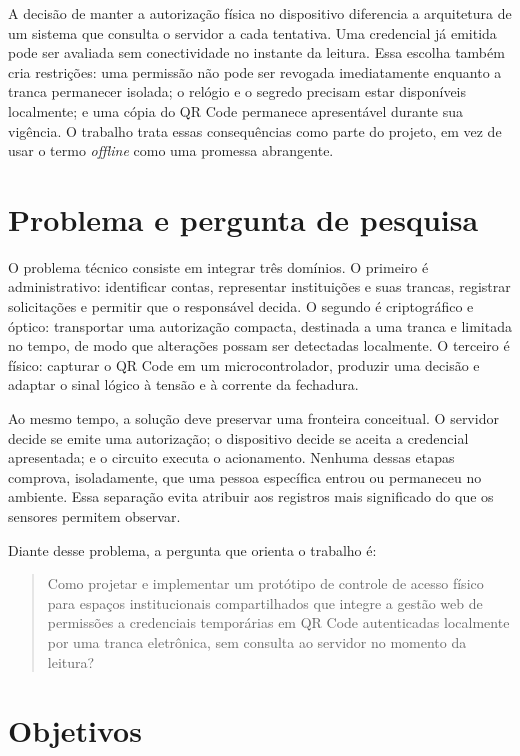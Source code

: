 A decisão de manter a autorização física no dispositivo diferencia a arquitetura de um sistema que consulta o servidor a cada tentativa. Uma credencial já emitida pode ser avaliada sem conectividade no instante da leitura. Essa escolha também cria restrições: uma permissão não pode ser revogada imediatamente enquanto a tranca permanecer isolada; o relógio e o segredo precisam estar disponíveis localmente; e uma cópia do QR Code permanece apresentável durante sua vigência. O trabalho trata essas consequências como parte do projeto, em vez de usar o termo \textit{offline} como uma promessa abrangente.

\section{Problema e pergunta de pesquisa}

O problema técnico consiste em integrar três domínios. O primeiro é administrativo: identificar contas, representar instituições e suas trancas, registrar solicitações e permitir que o responsável decida. O segundo é criptográfico e óptico: transportar uma autorização compacta, destinada a uma tranca e limitada no tempo, de modo que alterações possam ser detectadas localmente. O terceiro é físico: capturar o QR Code em um microcontrolador, produzir uma decisão e adaptar o sinal lógico à tensão e à corrente da fechadura.

Ao mesmo tempo, a solução deve preservar uma fronteira conceitual. O servidor decide se emite uma autorização; o dispositivo decide se aceita a credencial apresentada; e o circuito executa o acionamento. Nenhuma dessas etapas comprova, isoladamente, que uma pessoa específica entrou ou permaneceu no ambiente. Essa separação evita atribuir aos registros mais significado do que os sensores permitem observar.

Diante desse problema, a pergunta que orienta o trabalho é:

\begin{quote}
Como projetar e implementar um protótipo de controle de acesso físico para espaços institucionais compartilhados que integre a gestão web de permissões a credenciais temporárias em QR Code autenticadas localmente por uma tranca eletrônica, sem consulta ao servidor no momento da leitura?
\end{quote}

\section{Objetivos}

